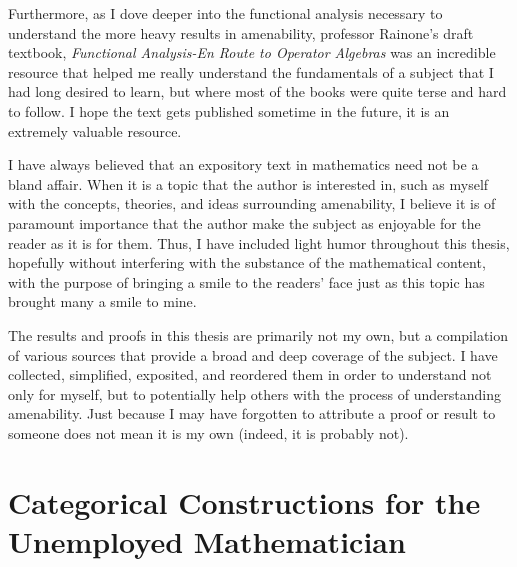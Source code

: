 \documentclass[10pt]{package2}
\begin{document}
Furthermore, as I dove deeper into the functional analysis necessary to understand the more heavy results in amenability, professor Rainone's draft textbook, \textit{Functional Analysis-En Route to Operator Algebras} was an incredible resource that helped me really understand the fundamentals of a subject that I had long desired to learn, but where most of the books were quite terse and hard to follow. I hope the text gets published sometime in the future, it is an extremely valuable resource.\newline

I have always believed that an expository text in mathematics need not be a bland affair. When it is a topic that the author is interested in, such as myself with the concepts, theories, and ideas surrounding amenability, I believe it is of paramount importance that the author make the subject as enjoyable for the reader as it is for them. Thus, I have included light humor throughout this thesis, hopefully without interfering with the substance of the mathematical content, with the purpose of bringing a smile to the readers' face just as this topic has brought many a smile to mine.\newline

The results and proofs in this thesis are primarily not my own, but a compilation of various sources that provide a broad and deep coverage of the subject. I have collected, simplified, exposited, and reordered them in order to understand not only for myself, but to potentially help others with the process of understanding amenability. Just because I may have forgotten to attribute a proof or result to someone does not mean it is my own (indeed, it is probably not).
\chapter{Categorical Constructions for the Unemployed Mathematician}\label{ch:categorical_constructions}

\end{document}
